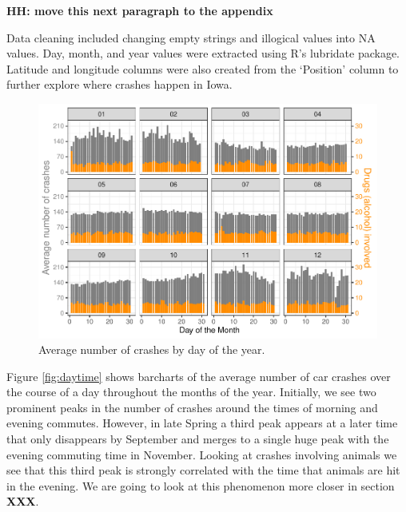 \documentclass[conference,final,]{IEEEtran}
\begin{document}
\textbf{HH: move this next paragraph to the appendix}

Data cleaning included changing empty strings and illogical values into NA values. Day, month, and year values were extracted using R's lubridate package. Latitude and longitude columns were also created from the `Position' column to further explore where crashes happen in Iowa.

\begin{figure}

{\centering \includegraphics[width=\columnwidth]{CAUSE_files/figure-latex/avgcrashes-1} 

}

\caption{Average number of crashes by day of the year.  }\label{fig:avgcrashes}
\end{figure}

Figure \ref{fig:daytime} shows barcharts of the average number of car crashes over the course of a day throughout the months of the year. Initially, we see two prominent peaks in the number of crashes around the times of morning and evening commutes. However, in late Spring a third peak appears at a later time that only disappears by September and merges to a single huge peak with the evening commuting time in November. Looking at crashes involving animals we see that this third peak is strongly correlated with the time that animals are hit in the evening. We are going to look at this phenomenon more closer in section \textbf{XXX}.
\end{document}
